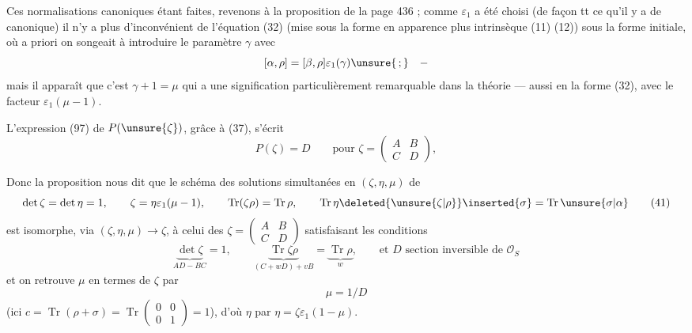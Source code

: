 
Ces normalisations canoniques étant faites, revenons à la proposition de la page 436 ; comme $\varepsilon_1$ a été choisi
(de façon tt ce qu'il y a de canonique) il n'y a plus d'inconvénient de
 l'équation (32) (mise sous la forme en apparence plus intrinsèque
(11)  (12)) sous la forme  initiale,
où a priori on songeait à introduire le paramètre $\gamma$ avec
\[
[\alpha,\rho]=[\beta,\rho]\varepsilon_1(\gamma)\unsure{\,;}\quad -
\]
mais il apparaît que c'est $\gamma+1=\mu$ qui a une signification particulièrement remarquable
dans la théorie --- aussi en  la forme (32), avec le facteur $\varepsilon_1(\mu-1)$.

L'expression (97) de $P(\unsure{\zeta})$, grâce à (37), s'écrit
\[
P(\zeta)=D\qquad\text{pour }\zeta=\begin{pmatrix}A&B\\C&D\end{pmatrix}, \tag{40}
\]


Donc la proposition nous dit que le schéma 
des solutions simultanées en $(\zeta,\eta,\mu)$ de
\[
\det\zeta=\det\eta=1,\qquad \zeta=\eta\varepsilon_1(\mu-1),\qquad
\operatorname{Tr}(\zeta\rho)=\operatorname{Tr}\rho,\qquad
\operatorname{Tr}\eta\deleted{\unsure{\zeta|\rho}}\inserted{\sigma}
=\operatorname{Tr}\unsure{\sigma|\alpha} \tag{41}
\]
est isomorphe, via $(\zeta,\eta,\mu)\longrightarrow\zeta$, à celui des
$\zeta=\begin{pmatrix}A&B\\C&D\end{pmatrix}$ satisfaisant les conditions
\[
\underbrace{\det\zeta}_{AD-BC}=1,\qquad
\underbrace{\operatorname{Tr}\zeta\rho}_{(C+wD)+vB}
=\underbrace{\operatorname{Tr}\rho}_{w},\qquad
\text{et }D\text{ section inversible de }\mathcal O_S \tag{42}
\]
et on retrouve $\mu$ en termes de $\zeta$ par
\[
\mu=1/D \tag{43}
\]
(ici $c=\operatorname{Tr}(\rho+\sigma)=\operatorname{Tr}\begin{pmatrix}0&0\\0&1\end{pmatrix}=1$),
d'où $\eta$ par $\eta=\zeta\varepsilon_1(1-\mu)$.

